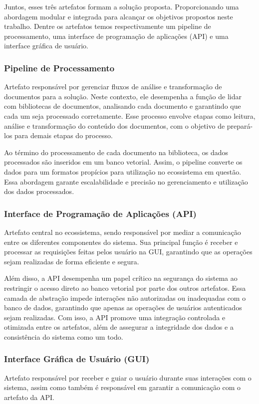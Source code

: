 \documentclass[a4paper, 12pt]{article}
\begin{document}
    Juntos, esses três artefatos formam a solução proposta. Proporcionando uma abordagem modular e integrada para alcançar os objetivos propostos neste trabalho. Dentre os artefatos temos respectivamente um pipeline de processamento, uma interface de programação de aplicações (API) e uma interface gráfica de usuário.
    
    \subsubsection{Pipeline de Processamento}

    Artefato responsável por gerenciar fluxos de análise e transformação de documentos para a solução. Neste contexto, ele desempenha a função de lidar com bibliotecas de documentos, analisando cada documento e garantindo que cada um seja processado corretamente. Esse processo envolve etapas como leitura, análise e transformação do conteúdo dos documentos, com o objetivo de prepará-los para demais etapas do processo.  

    Ao término do processamento de cada documento na biblioteca, os dados processados são inseridos em um banco vetorial. Assim, o pipeline converte os dados para um formatos propícios para utilização no ecossistema em questão. Essa abordagem garante escalabilidade e precisão no gerenciamento e utilização dos dados processados.
    
    \subsubsection{Interface de Programação de Aplicações (API)}

    Artefato central no ecossistema, sendo responsável por mediar a comunicação entre os diferentes componentes do sistema. Sua principal função é receber e processar as requisições feitas pelos usuário na GUI, garantindo que as operações sejam realizadas de forma eficiente e segura.

    Além disso, a API desempenha um papel crítico na segurança do sistema ao restringir o acesso direto ao banco vetorial por parte dos outros artefatos. Essa camada de abstração impede interações não autorizadas ou inadequadas com o banco de dados, garantindo que apenas as operações de usuários autenticados sejam realizadas. Com isso, a API promove uma integração controlada e otimizada entre os artefatos, além de assegurar a integridade dos dados e a consistência do sistema como um todo.
    
    \subsubsection{Interface Gráfica de Usuário (GUI)}
    Artefato responsável por receber e guiar o usuário durante suas interações com o sistema, assim como também é responsável em garantir a comunicação com o artefato da API.
\end{document}
